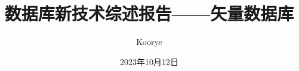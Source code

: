 \documentclass{article}
\title{数据库新技术综述报告——矢量数据库}
\author{Koorye}
\date{2023年10月12日}
\begin{document}
\begin{titlepage}
\maketitle
\end{titlepage}

\tableofcontents
\newpage









\newpage


\end{document}
